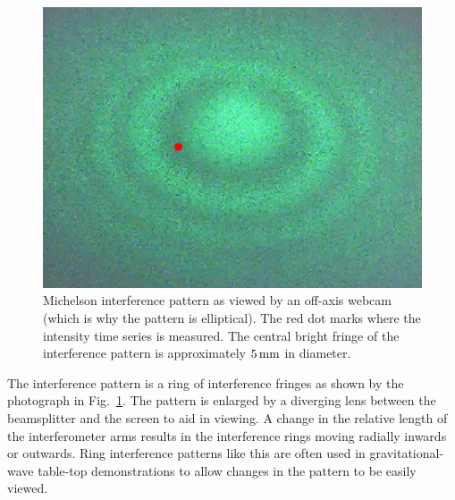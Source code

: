 \documentclass[paper-main.tex]{subfiles}
\begin{document}
\begin{figure}
 \begin{center}
  \includegraphics[width=.45\textwidth]{figures/webcam_still0_crop.pdf}
 \end{center}
 \caption{\label{fig:interference_pattern}
Michelson interference pattern as viewed by an off-axis webcam (which is why the pattern is elliptical). 
The red dot marks where the intensity time series is measured. 
The central bright fringe of the interference pattern is approximately $5\,{\rm mm}$ in diameter. 
}
\end{figure}

The interference pattern is a ring of interference fringes as shown by the photograph in Fig.~\ref{fig:interference_pattern}. 
The pattern is enlarged by a diverging lens between the beamsplitter and the screen to aid in viewing. 
A change in the relative length of the interferometer arms results in the interference rings moving radially inwards or outwards. 
Ring interference patterns like this are often used in gravitational-wave table-top demonstrations to allow changes in the pattern to be easily viewed. 
\end{document}
